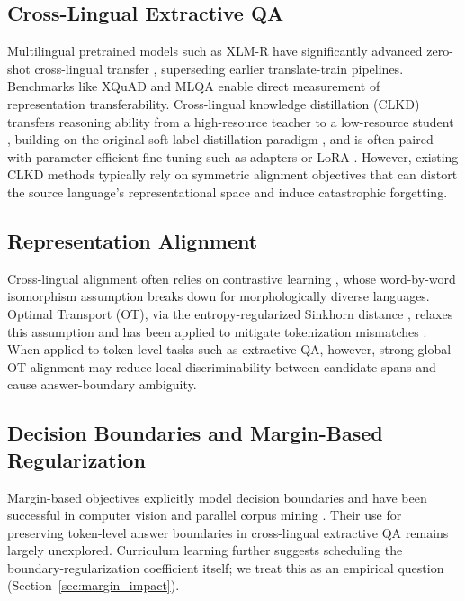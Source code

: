 \documentclass[11pt]{article}
\begin{document}
\subsection{Cross-Lingual Extractive QA}
Multilingual pretrained models such as XLM-R have significantly advanced zero-shot cross-lingual transfer \citep{conneau-etal-2020-unsupervised}, superseding earlier translate-train pipelines. Benchmarks like XQuAD and MLQA \citep{artetxe-etal-2020-cross, lewis-etal-2020-mlqa} enable direct measurement of representation transferability. Cross-lingual knowledge distillation (CLKD) transfers reasoning ability from a high-resource teacher to a low-resource student \citep{gupta-etal-2023-cross}, building on the original soft-label distillation paradigm \citep{hinton2015distillingknowledgeneuralnetwork}, and is often paired with parameter-efficient fine-tuning such as adapters \citep{pfeiffer-etal-2020-mad} or LoRA \citep{hu2021loralowrankadaptationlarge}. However, existing CLKD methods typically rely on symmetric alignment objectives that can distort the source language’s representational space and induce catastrophic forgetting.

\subsection{Representation Alignment}
Cross-lingual alignment often relies on contrastive learning \citep{chi-etal-2021-infoxlm}, whose word-by-word isomorphism assumption breaks down for morphologically diverse languages. Optimal Transport (OT), via the entropy-regularized Sinkhorn distance \citep{cuturi2013sinkhorndistanceslightspeedcomputation}, relaxes this assumption and has been applied to mitigate tokenization mismatches \citep{sherborne-etal-2023-optimal}. When applied to token-level tasks such as extractive QA, however, strong global OT alignment may reduce local discriminability between candidate spans and cause answer-boundary ambiguity.

\subsection{Decision Boundaries and Margin-Based Regularization}
Margin-based objectives explicitly model decision boundaries and have been successful in computer vision \citep{liu2018spherefacedeephypersphereembedding, wang2018cosfacelargemargincosine, Deng_2022} and parallel corpus mining \citep{artetxe-schwenk-2019-margin}. Their use for preserving token-level answer boundaries in cross-lingual extractive QA remains largely unexplored. Curriculum learning \citep{10.1145/1553374.1553380} further suggests scheduling the boundary-regularization coefficient itself; we treat this as an empirical question (Section~\ref{sec:margin_impact}).
\end{document}
